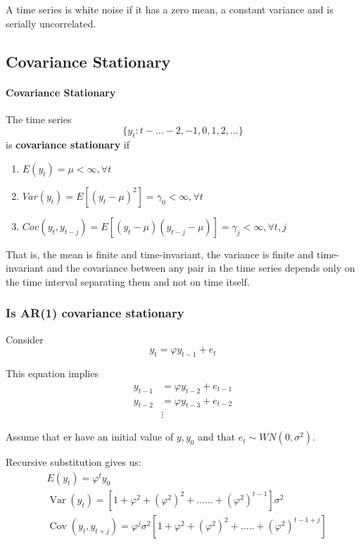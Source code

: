 \documentclass[11pt]{article}
\begin{document}
A time series is white noise if it has a zero mean, a constant variance and is serially uncorrelated.

\subsection{Covariance Stationary}
\begin{mdframed}
    \paragraph{Covariance Stationary} \mbox{}

    The time series 
    \[\{y_t: t - \ldots -2, -1, 0, 1, 2, \ldots \}\]
    is \textbf{covariance stationary} if
    \begin{enumerate}
        \item $E(y_t) = \mu <\infty, \forall t$
        \item $Var(y_t) = E[(y_t-\mu)^2] = \gamma_0 < \infty, \forall t$
        \item $Cov(y_t, y_{t-j}) = E[(y_t-\mu)(y_{t-j}-\mu)] = \gamma_j <\infty, \forall t,j$
    \end{enumerate}
    That is, the mean is finite and time-invariant, the variance is finite and time-invariant and the covariance between any pair in the time series depends only on the time interval separating them and not on time itself.
\end{mdframed}

\subsubsection{Is AR(1) covariance stationary}

Consider
\[y_t = \varphi y_{t-1} + e_t\]

This equation implies 
\begin{equation}
\begin{aligned}
 y_{t-1}&=\varphi y_{t-2}+e_{t-1} \\
 y_{t-2}&=\varphi y_{t-3}+e_{t-2} \\
&\vdots
\end{aligned}
\end{equation}

Assume that er have an initial value of $y, y_0$ and that $e_t \sim WN(0,\sigma^2)$.

Recursive substitution gives us:
\begin{equation}
\begin{aligned}
& E\left(y_t\right)=\varphi^t y_0 \\
& \operatorname{Var}\left(y_t\right)=\left[1+\varphi^2+\left(\varphi^2\right)^2+\ldots \ldots+\left(\varphi^2\right)^{t-1}\right] \sigma^2 \\
& \operatorname{Cov}\left(y_t, y_{t+j}\right)=\varphi^j \sigma^2\left[1+\varphi^2+\left(\varphi^2\right)^2+\ldots . .+\left(\varphi^2\right)^{t-1+j}\right]
\end{aligned}
\end{equation}
\end{document}
